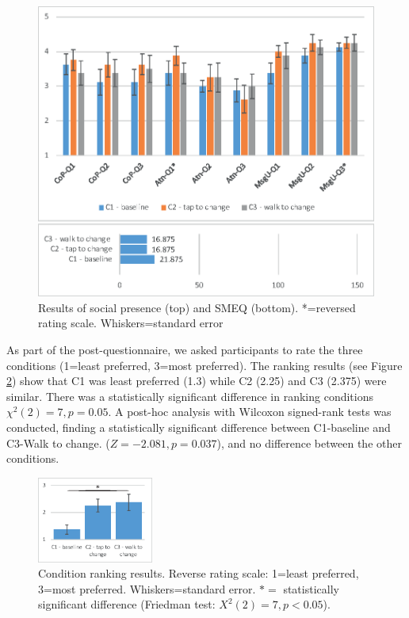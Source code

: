 \begin{figure}[h]
  \centering
  \includegraphics[width=\columnwidth]{images/chi/images-01.eps}
  \caption{Results of social presence (top) and SMEQ (bottom). *=reversed rating scale. Whiskers=standard error}
  \label{fig:data:results}
\end{figure}

As part of the post-questionnaire, we asked participants to rate the three conditions (1=least preferred, 3=most preferred). The ranking results (see Figure \ref{fig:data:ranking}) show that C1 was least preferred (1.3) while C2 (2.25) and C3 (2.375) were similar. There was a statistically significant difference in ranking conditions $\chi^2(2)=7, p=0.05$. A post-hoc analysis with Wilcoxon signed-rank tests was conducted, finding a statistically significant difference between C1-baseline and C3-Walk to change. ($Z=-2.081, p=0.037$), and no difference between the other conditions.

\begin{figure}[h]
  \centering
  \includegraphics[width=1.5in]{images/chi/images-05.eps}
  \caption{Condition ranking results. Reverse rating scale: 1=least preferred, 3=most preferred. Whiskers=standard error. $*=$ statistically significant difference (Friedman test: $X^2(2)=7, p<0.05$).}  
      \label{fig:data:ranking}
\end{figure}

